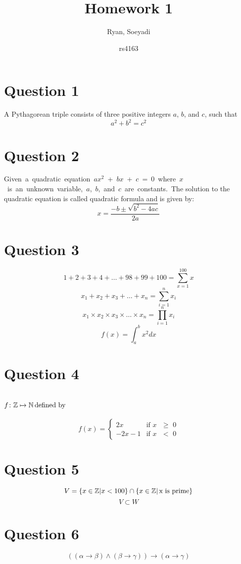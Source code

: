 \documentclass{article}
\title{Homework 1}
\author
{
Ryan, Soeyadi
\and rs4163
}
\newcommand{\Z}{\mathbb{Z}}
\newcommand{\N}{\mathbb{N}}
\begin{document}
    \maketitle
    
    \section*{Question 1}
    A Pythagorean triple consists of three positive integers $a$, $b$, and $c$, such that
    \[a^2+b^2=c^2\]
    \section*{Question 2}
    \mbox{Given a quadratic equation $ax^2$ + $bx$ + $c$ = 0 where $x$ is an unknown variable, $a$, $b$, and $c$ are constants. The} solution to the quadratic equation is called quadratic formula and is given by:
    \[x= \frac{-b \pm \sqrt{b^2 - 4ac}}{2a}\]
    \section*{Question 3}
    \[1 + 2 + 3 + 4 + \dots + 98 + 99 + 100 = \sum_{x=1}^{100}{x}\]
    \[x_1 + x_2 + x_3 + \dots + x_n = \sum_{i=1}^{n}{x_i}\]
    \[x_1 \times x_2 \times x_3 \times\dots\times x_n = \prod_{i=1}^{n}{x_i}\]
    \[f(x) = \int^b_a x^2dx\]
    \section*{Question 4}
   \section*{
    $f\colon \Z \mapsto \N \textit{\normalfont \,defined by}$ 
    }
    \[
    	f(x) =
	\begin{cases}
					2x & \text{if $x$ $\geq$ 0} \\
					-2x - 1 & \text{if $x$ $<$ 0}
	\end{cases}
	\]
     
  
 
    \section*{Question 5}
    \[V = \{ x \in \Z | x < 100 \} \cap \{ x \in \Z | \text{\,x is prime} \} \] \smallskip
    \[V \subset W\]
     \section*{Question 6}
    \[((\alpha\rightarrow\beta) \land (\beta\rightarrow\gamma)) \rightarrow (\alpha\rightarrow\gamma)\]
\end{document}
